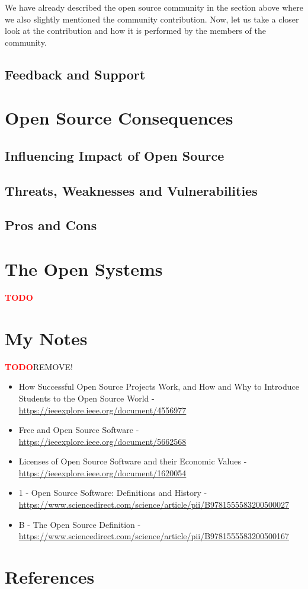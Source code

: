 \documentclass[11pt,a4paper]{article}
\newcommand{\TODO}{\textbf{\textcolor{red}{TODO}}} %
\theoremstyle{definition}
\begin{document}
    We have already described the open source community in the section above where we also slightly mentioned the community contribution. Now, let us take a closer look at the contribution and how it is performed by the members of the community.

    \subsection{Feedback and Support}

\section{Open Source Consequences}

    \subsection{Influencing Impact of Open Source}

    \subsection{Threats, Weaknesses and Vulnerabilities}

    \subsection{Pros and Cons}

\section{The Open Systems}

    \TODO

\section{My Notes}

    \TODO REMOVE!

    \begin{itemize}
      \item How Successful Open Source Projects Work, and How and Why to Introduce Students to the Open Source World - \url{https://ieeexplore.ieee.org/document/4556977}
      \item Free and Open Source Software - \url{https://ieeexplore.ieee.org/document/5662568}
      \item Licenses of Open Source Software and their Economic Values - \url{https://ieeexplore.ieee.org/document/1620054}
      \item 1 - Open Source Software: Definitions and History - \url{https://www.sciencedirect.com/science/article/pii/B9781555583200500027}
      \item B - The Open Source Definition - \url{https://www.sciencedirect.com/science/article/pii/B9781555583200500167}
    \end{itemize}

\newpage

\section{References}

\begin{flushleft}
    
\end{flushleft}
\end{document}

